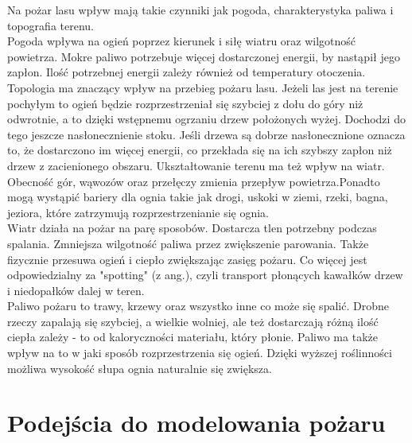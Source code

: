 \documentclass[a4paper, 11pt]{article}
\begin{document}
	Na pożar lasu wpływ mają takie czynniki jak pogoda, charakterystyka paliwa i topografia terenu.	\\
	\indent
	Pogoda wpływa na ogień poprzez kierunek i siłę wiatru oraz wilgotność powietrza. Mokre paliwo potrzebuje więcej dostarczonej energii, by nastąpił jego zapłon. Ilość potrzebnej energii zależy również od temperatury otoczenia.	\\
	\indent
	Topologia ma znaczący wpływ na przebieg pożaru lasu. Jeżeli las jest na terenie pochyłym to ogień będzie rozprzestrzeniał się szybciej z dołu do góry niż odwrotnie, a to dzięki wstępnemu ogrzaniu drzew położonych wyżej. Dochodzi do tego jeszcze nasłonecznienie stoku. Jeśli drzewa są dobrze nasłonecznione oznacza to, że dostarczono im więcej energii, co przekłada się na ich szybszy zapłon niż drzew z zacienionego obszaru. Ukształtowanie terenu ma też wpływ na wiatr. Obecność gór, wąwozów oraz przełęczy zmienia przepływ powietrza.Ponadto mogą wystąpić bariery dla ognia takie jak drogi, uskoki w ziemi, rzeki, bagna, jeziora, które zatrzymują rozprzestrzenianie się ognia.\\
	\indent
	Wiatr działa na pożar na parę sposobów. Dostarcza tlen potrzebny podczas spalania. Zmniejsza wilgotność paliwa przez zwiększenie parowania. Także fizycznie przesuwa ogień i ciepło zwiększając zasięg pożaru. Co więcej jest odpowiedzialny za "spotting" (z ang.), czyli transport płonących kawałków drzew i niedopałków dalej w teren.\\
	\indent
	Paliwo pożaru to trawy, krzewy oraz wszystko inne co może się spalić. Drobne rzeczy zapalają się szybciej, a wielkie wolniej, ale też dostarczają różną ilość ciepła zależy - to od kaloryczności materiału, który płonie. Paliwo ma także wpływ na to w jaki sposób rozprzestrzenia się ogień. Dzięki wyższej roślinności możliwa wysokość słupa ognia naturalnie się zwiększa.  \\
	
	\section*{Podejścia do modelowania pożaru}
	\indent
	
\end{document}
